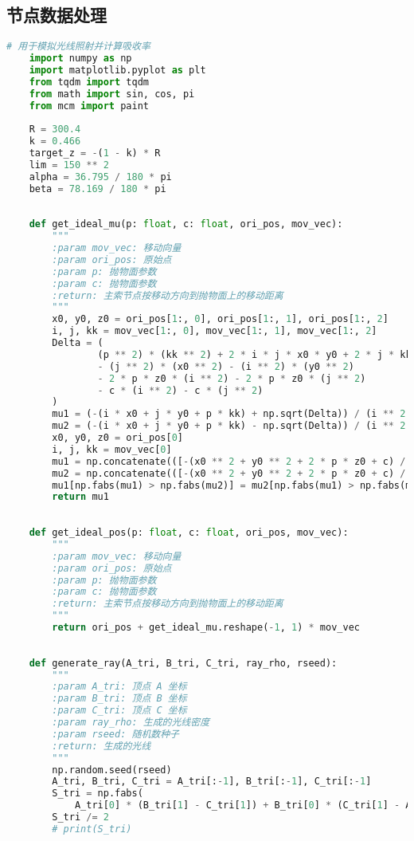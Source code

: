 \documentclass[withoutpreface,bwprint,fontset=macnew]{cumcmthesis} %
\begin{document}
	\begin{appendices}
	\section{节点数据处理}
	\begin{lstlisting}[language=python]
		# 用于模拟光线照射并计算吸收率
	import numpy as np
	import matplotlib.pyplot as plt
	from tqdm import tqdm
	from math import sin, cos, pi
	from mcm import paint
	
	R = 300.4
	k = 0.466
	target_z = -(1 - k) * R
	lim = 150 ** 2
	alpha = 36.795 / 180 * pi
	beta = 78.169 / 180 * pi
	
	
	def get_ideal_mu(p: float, c: float, ori_pos, mov_vec):
	    """
	    :param mov_vec: 移动向量
	    :param ori_pos: 原始点
	    :param p: 抛物面参数
	    :param c: 抛物面参数
	    :return: 主索节点按移动方向到抛物面上的移动距离
	    """
	    x0, y0, z0 = ori_pos[1:, 0], ori_pos[1:, 1], ori_pos[1:, 2]
	    i, j, kk = mov_vec[1:, 0], mov_vec[1:, 1], mov_vec[1:, 2]
	    Delta = (
	            (p ** 2) * (kk ** 2) + 2 * i * j * x0 * y0 + 2 * j * kk * p * y0 + 2 * i * kk * p * x0
	            - (j ** 2) * (x0 ** 2) - (i ** 2) * (y0 ** 2)
	            - 2 * p * z0 * (i ** 2) - 2 * p * z0 * (j ** 2)
	            - c * (i ** 2) - c * (j ** 2)
	    )
	    mu1 = (-(i * x0 + j * y0 + p * kk) + np.sqrt(Delta)) / (i ** 2 + j ** 2)
	    mu2 = (-(i * x0 + j * y0 + p * kk) - np.sqrt(Delta)) / (i ** 2 + j ** 2)
	    x0, y0, z0 = ori_pos[0]
	    i, j, kk = mov_vec[0]
	    mu1 = np.concatenate(([-(x0 ** 2 + y0 ** 2 + 2 * p * z0 + c) / (2 * p * kk)], mu1))
	    mu2 = np.concatenate(([-(x0 ** 2 + y0 ** 2 + 2 * p * z0 + c) / (2 * p * kk)], mu2))
	    mu1[np.fabs(mu1) > np.fabs(mu2)] = mu2[np.fabs(mu1) > np.fabs(mu2)]
	    return mu1
	
	
	def get_ideal_pos(p: float, c: float, ori_pos, mov_vec):
	    """
	    :param mov_vec: 移动向量
	    :param ori_pos: 原始点
	    :param p: 抛物面参数
	    :param c: 抛物面参数
	    :return: 主索节点按移动方向到抛物面上的移动距离
	    """
	    return ori_pos + get_ideal_mu.reshape(-1, 1) * mov_vec
	
	
	def generate_ray(A_tri, B_tri, C_tri, ray_rho, rseed):
	    """
	    :param A_tri: 顶点 A 坐标
	    :param B_tri: 顶点 B 坐标
	    :param C_tri: 顶点 C 坐标
	    :param ray_rho: 生成的光线密度
	    :param rseed: 随机数种子
	    :return: 生成的光线
	    """
	    np.random.seed(rseed)
	    A_tri, B_tri, C_tri = A_tri[:-1], B_tri[:-1], C_tri[:-1]
	    S_tri = np.fabs(
	        A_tri[0] * (B_tri[1] - C_tri[1]) + B_tri[0] * (C_tri[1] - A_tri[1]) + C_tri[0] * (A_tri[1] - B_tri[1]))
	    S_tri /= 2
	    # print(S_tri)
	

\end{lstlisting}
\end{appendices}
\end{document}
